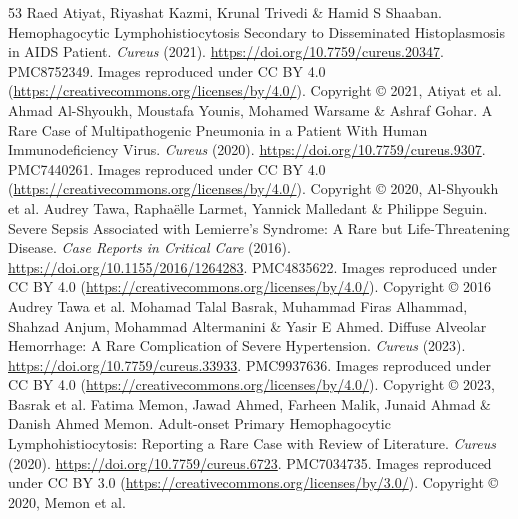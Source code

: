 \begin{thebibliography}{53}
 Raed Atiyat, Riyashat Kazmi, Krunal Trivedi \& Hamid S Shaaban. Hemophagocytic Lymphohistiocytosis Secondary to Disseminated Histoplasmosis in AIDS Patient. \textit{Cureus} (2021). \url{https://doi.org/10.7759/cureus.20347}. PMC8752349. Images reproduced under CC BY 4.0 (\url{https://creativecommons.org/licenses/by/4.0/}). Copyright © 2021, Atiyat et al.
 Ahmad Al-Shyoukh, Moustafa Younis, Mohamed Warsame \& Ashraf Gohar. A Rare Case of Multipathogenic Pneumonia in a Patient With Human Immunodeficiency Virus. \textit{Cureus} (2020). \url{https://doi.org/10.7759/cureus.9307}. PMC7440261. Images reproduced under CC BY 4.0 (\url{https://creativecommons.org/licenses/by/4.0/}). Copyright © 2020, Al-Shyoukh et al.
 Audrey Tawa, Raphaëlle Larmet, Yannick Malledant \& Philippe Seguin. Severe Sepsis Associated with Lemierre's Syndrome: A Rare but Life-Threatening Disease. \textit{Case Reports in Critical Care} (2016). \url{https://doi.org/10.1155/2016/1264283}. PMC4835622. Images reproduced under CC BY 4.0 (\url{https://creativecommons.org/licenses/by/4.0/}). Copyright © 2016 Audrey Tawa et al.
 Mohamad Talal Basrak, Muhammad Firas Alhammad, Shahzad Anjum, Mohammad Altermanini \& Yasir E Ahmed. Diffuse Alveolar Hemorrhage: A Rare Complication of Severe Hypertension. \textit{Cureus} (2023). \url{https://doi.org/10.7759/cureus.33933}. PMC9937636. Images reproduced under CC BY 4.0 (\url{https://creativecommons.org/licenses/by/4.0/}). Copyright © 2023, Basrak et al.
 Fatima Memon, Jawad Ahmed, Farheen Malik, Junaid Ahmad \& Danish Ahmed Memon. Adult-onset Primary Hemophagocytic Lymphohistiocytosis: Reporting a Rare Case with Review of Literature. \textit{Cureus} (2020). \url{https://doi.org/10.7759/cureus.6723}. PMC7034735. Images reproduced under CC BY 3.0 (\url{https://creativecommons.org/licenses/by/3.0/}). Copyright © 2020, Memon et al.
\end{thebibliography}
